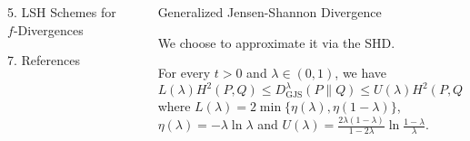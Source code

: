 \documentclass[final]{beamer}
\newcommand{\wjs}[3]{D_{\mathrm{GJS}}^{#1}( #2 \parallel #3 )}
\newlength{\sepwid}
\newlength{\onecolwid}
\newlength{\threecolwid}
\begin{document}
\begin{frame}[t]
\begin{columns}[t]
\begin{column}{\onecolwid}
\begin{block}{5. LSH Schemes for $ f $-Divergences}
	
\end{block}

\begin{block}{7. References}
		
		
	\end{block}
\end{column} %
 		\begin{column}{\sepwid}\end{column} %
\begin{column}{\threecolwid} %
	\vspace{-40pt}
	
	\begin{block}{Generalized Jensen-Shannon 
			Divergence}
		
		
		We choose to approximate it via the SHD.

		For every  $ 
		t>0 $ 
		and $ \lambda\in (0,1) $, we have
		\begin{equation*}
		L(\lambda)H^2(P, Q)\le 	\wjs{\lambda}{P}{Q}
		\le  U(\lambda)H^2(P, Q)\le 
		H^2(P, 
		Q) ,
		\end{equation*}
		where $ L(\lambda) = 2 \min\{ \eta(\lambda), 
		\eta(1-\lambda) \} $, $ \eta(\lambda) = -\lambda \ln \lambda $ and 
		$ 
		U(\lambda) = 
		\frac{2\lambda(1-\lambda)}{1-2\lambda}\ln \frac{1-\lambda}{\lambda} 
		$.
		

\end{block}
\end{column}
\end{columns}
\end{frame}
\end{document}
